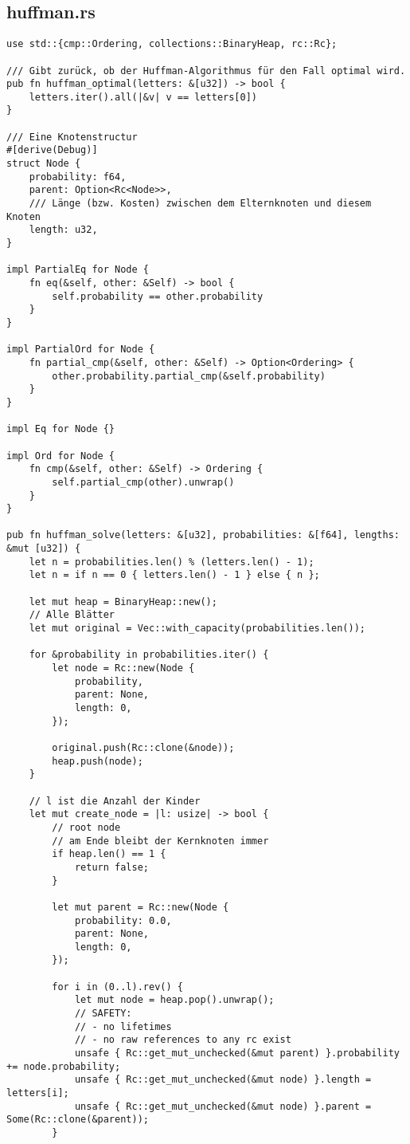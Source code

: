 \subsection{huffman.rs}
\begin{lstlisting}
use std::{cmp::Ordering, collections::BinaryHeap, rc::Rc};

/// Gibt zurück, ob der Huffman-Algorithmus für den Fall optimal wird.
pub fn huffman_optimal(letters: &[u32]) -> bool {
    letters.iter().all(|&v| v == letters[0])
}

/// Eine Knotenstructur
#[derive(Debug)]
struct Node {
    probability: f64,
    parent: Option<Rc<Node>>,
    /// Länge (bzw. Kosten) zwischen dem Elternknoten und diesem Knoten  
    length: u32,
}

impl PartialEq for Node {
    fn eq(&self, other: &Self) -> bool {
        self.probability == other.probability
    }
}

impl PartialOrd for Node {
    fn partial_cmp(&self, other: &Self) -> Option<Ordering> {
        other.probability.partial_cmp(&self.probability)
    }
}

impl Eq for Node {}

impl Ord for Node {
    fn cmp(&self, other: &Self) -> Ordering {
        self.partial_cmp(other).unwrap()
    }
}

pub fn huffman_solve(letters: &[u32], probabilities: &[f64], lengths: &mut [u32]) {
    let n = probabilities.len() % (letters.len() - 1);
    let n = if n == 0 { letters.len() - 1 } else { n };

    let mut heap = BinaryHeap::new();
    // Alle Blätter
    let mut original = Vec::with_capacity(probabilities.len());

    for &probability in probabilities.iter() {
        let node = Rc::new(Node {
            probability,
            parent: None,
            length: 0,
        });

        original.push(Rc::clone(&node));
        heap.push(node);
    }

    // l ist die Anzahl der Kinder
    let mut create_node = |l: usize| -> bool {
        // root node
        // am Ende bleibt der Kernknoten immer
        if heap.len() == 1 {
            return false;
        }

        let mut parent = Rc::new(Node {
            probability: 0.0,
            parent: None,
            length: 0,
        });

        for i in (0..l).rev() {
            let mut node = heap.pop().unwrap();
            // SAFETY:
            // - no lifetimes
            // - no raw references to any rc exist
            unsafe { Rc::get_mut_unchecked(&mut parent) }.probability += node.probability;
            unsafe { Rc::get_mut_unchecked(&mut node) }.length = letters[i];
            unsafe { Rc::get_mut_unchecked(&mut node) }.parent = Some(Rc::clone(&parent));
        }


\end{lstlisting}
